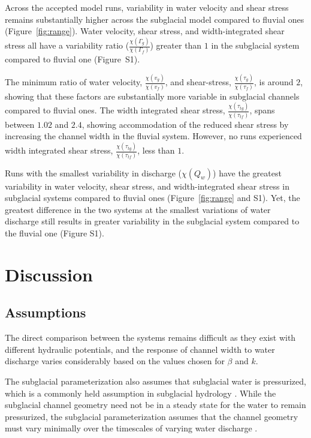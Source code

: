 \documentclass[11pt]{article}
\begin{document}
\begin{spacing}{1}
          Across the accepted model runs, variability in water velocity and shear stress remains substantially higher across the subglacial model compared to fluvial ones (Figure~\ref{fig:range}).
          Water velocity, shear stress, and width-integrated shear stress all have a variability ratio ($\frac{\chi(\Gamma_{g})}{\chi(\Gamma_f)}$) greater than $1$ in the subglacial  system compared to fluvial one (Figure~S1).
          
          The minimum ratio of  water velocity, $\frac{\chi(v_{g})}{\chi(v_{f})}$, and shear-stress, $\frac{\chi(\tau_{g})}{\chi(\tau_{f})}$, is around $2$, showing that these factors are substantially more variable in subglacial channels compared to fluvial ones.
          The width integrated shear stress, $\frac{\chi(\tau_{tg})}{\chi( \tau_{tf})}$, spans between $1.02$ and $2.4$, showing  accommodation of the reduced shear stress by increasing the channel width in the fluvial system.
          However, no runs experienced width integrated shear stress, $\frac{\chi(\tau_{tg})}{\chi( \tau_{tf})}$, less than $1$.
          
          Runs with the smallest variability in discharge ($\chi(Q_w)$) have the greatest variability in water velocity, shear stress, and width-integrated shear stress in subglacial systems compared to fluvial ones (Figure~\ref{fig:range} and S1).
          Yet, the greatest difference in the two systems at the smallest variations of water discharge still results in greater variability in the subglacial system compared to the fluvial one (Figure S1).
        
          \section{Discussion}
          \subsection{Assumptions}
        
          The direct comparison between the systems remains difficult as they exist with different hydraulic potentials, and the response of channel width to water discharge varies considerably based on the values chosen for $\beta$ and $k$.
        
          The subglacial parameterization also assumes that subglacial water is pressurized, which is a commonly held assumption in subglacial hydrology \citep[e.g.][]{gimbert2016}.
          While the subglacial channel geometry need not be in a steady state for the water to remain pressurized, the subglacial parameterization assumes that the channel geometry must vary minimally over the timescales of varying  water discharge \citep[e.g.][]{nanni2020}.
          

\end{spacing}
\end{document}
